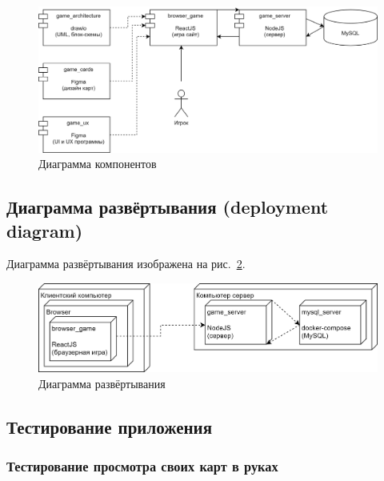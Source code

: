 \documentclass[12pt, a4paper, simple]{eskdtext}
\begin{document}
    \begin{figure}[!h]
        \centering
        \includegraphics[width=16cm]
            {../sources/game_architecture/build/game__component_diagram.png}
        \caption{Диаграмма компонентов}
        \label{fig:game__component_diagram}
    \end{figure}

    \subsection{Диаграмма развёртывания (deployment diagram)}

    Диаграмма развёртывания изображена на рис.~\ref{fig:game__deployment_diagram}.

    \begin{figure}[!h]
        \centering
        \includegraphics[width=16cm]
            {../sources/game_architecture/build/game__deployment_diagram.png}
        \caption{Диаграмма развёртывания}
        \label{fig:game__deployment_diagram}
    \end{figure}

    \newpage
    \subsection{Тестирование приложения}


    \subsubsection*{Тестирование просмотра своих карт в руках}
\end{document}
